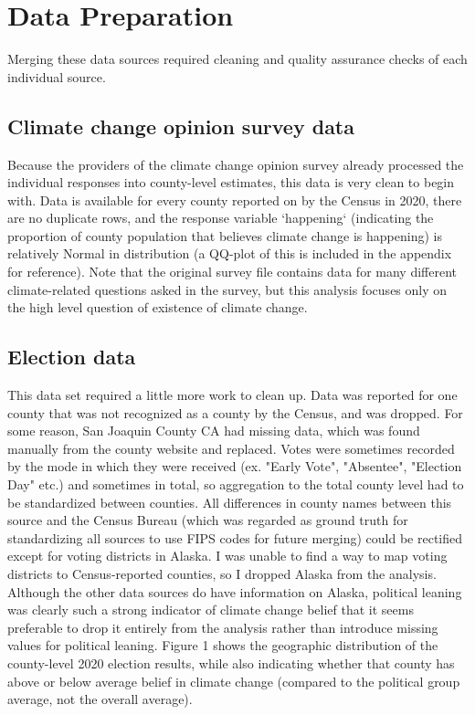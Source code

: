 \documentclass{article}
\begin{document}
\section{Data Preparation}

Merging these data sources required cleaning and quality
assurance checks of each individual source.

\subsection{Climate change opinion survey data}
Because the providers of the climate change opinion survey already processed
the individual responses into county-level estimates, this data is very clean
to begin with. Data is available for every county reported on by the Census
in 2020, there are no duplicate rows, and the response variable `happening`
(indicating the proportion of county population that believes climate change
is happening) is relatively Normal in distribution (a QQ-plot of this is included in the appendix for reference). Note that the original
survey file contains data for many different climate-related questions asked
in the survey, but this analysis focuses only on the high level
question of existence of climate change.

\subsection{Election data}
This data set required a little more work to clean up. Data was reported for
one county that was not recognized as a county by the Census, and was dropped. For
some reason, San Joaquin County CA had missing data, which was found 
manually from the county website and replaced. Votes were sometimes
recorded by the mode in which they were received (ex. "Early Vote", 
"Absentee", "Election Day" etc.) and sometimes in total, so aggregation to 
the total county level had to be standardized between counties. All differences in county names between this source and the 
Census Bureau (which was regarded as ground truth for standardizing all sources
to use FIPS codes for future merging) could be rectified except for voting districts in Alaska.
I was unable to find a way to map voting districts to Census-reported
counties, so I dropped Alaska from the analysis. Although the other data
sources do have information on Alaska, political leaning was clearly such a
strong indicator of climate change belief that it seems preferable to
drop it entirely from the analysis rather than introduce missing values for
political leaning.
Figure 1 shows the geographic distribution of the county-level 2020 election
results, while also indicating whether that county has above or below average
belief in climate change (compared to the political group average, not the
overall average).
\end{document}
